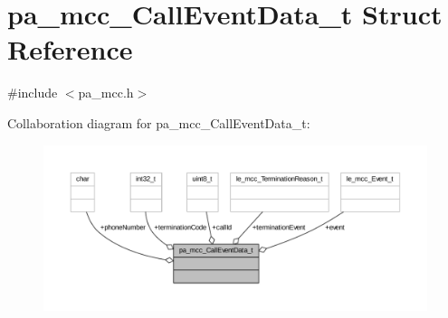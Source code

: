 \hypertarget{structpa__mcc___call_event_data__t}{}\section{pa\+\_\+mcc\+\_\+\+Call\+Event\+Data\+\_\+t Struct Reference}
\label{structpa__mcc___call_event_data__t}


{\ttfamily \#include $<$pa\+\_\+mcc.\+h$>$}



Collaboration diagram for pa\+\_\+mcc\+\_\+\+Call\+Event\+Data\+\_\+t\+:
\nopagebreak
\begin{figure}[H]
\begin{center}
\leavevmode
\includegraphics[width=350pt]{structpa__mcc___call_event_data__t__coll__graph}
\end{center}
\end{figure}
